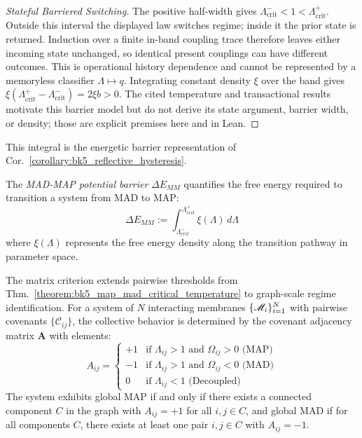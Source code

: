 \begin{proof}[Stateful Barriered Switching]
\label{proof:bk5_stability_map_mad_patterns}
The positive half-width gives
$\Lambda^-_{\mathrm{crit}}<1<\Lambda^+_{\mathrm{crit}}$. Outside this interval
the displayed law switches regime; inside it the prior state is returned.
Induction over a finite in-band coupling trace therefore leaves either incoming
state unchanged, so identical present couplings can have different outcomes.
This is operational history dependence and cannot be represented by a
memoryless classifier $\Lambda\mapsto q$. Integrating constant density $\xi$
over the band gives $\xi(\Lambda^+_{\mathrm{crit}}-
\Lambda^-_{\mathrm{crit}})=2\xi b>0$. The cited temperature and transactional
results motivate this barrier model but do not derive its state argument,
barrier width, or density; those are explicit premises here and in Lean.
\end{proof}
\begin{definition} \label{definition:bk5_mad_map_potential_barrie} 
This integral is the energetic barrier representation of Cor.~\ref{corollary:bk5_reflective_hysteresis}.

The \emph{MAD-MAP potential barrier} $\Delta E_{MM}$ quantifies the free energy required to transition a system from MAD to MAP:
\begin{equation}
\Delta E_{MM} := \int_{\Lambda_{crit}^-}^{\Lambda_{crit}^+} \xi(\Lambda) \, d\Lambda
\end{equation}
\noindent where $\xi(\Lambda)$ represents the free energy density along the transition pathway in parameter space.
\end{definition}
\begin{proposition} 
\label{proposition:bk5_multi_agent_map_mad_classification}
The matrix criterion extends pairwise thresholds from Thm.~\ref{theorem:bk5_map_mad_critical_temperature} to graph-scale regime identification.
For a system of $N$ interacting membranes $\{\mathscr{M}_i\}_{i=1}^N$ with pairwise covenants $\{\mathcal{C}_{ij}\}$, the collective behavior is determined by the covenant adjacency matrix $\mathbf{A}$ with elements:
\begin{equation}
A_{ij} = 
\begin{cases}
+1 & \text{if } \Lambda_{ij} > 1 \text{ and } \Omega_{ij} > 0 \text{ (MAP)} \\
-1 & \text{if } \Lambda_{ij} > 1 \text{ and } \Omega_{ij} < 0 \text{ (MAD)} \\
0 & \text{if } \Lambda_{ij} < 1 \text{ (Decoupled)}
\end{cases}
\end{equation}
The system exhibits global MAP if and only if there exists a connected component $C$ in the graph with $A_{ij} = +1$ for all $i,j \in C$, and global MAD if for all components $C$, there exists at least one pair $i,j \in C$ with $A_{ij} = -1$.
\end{proposition}
